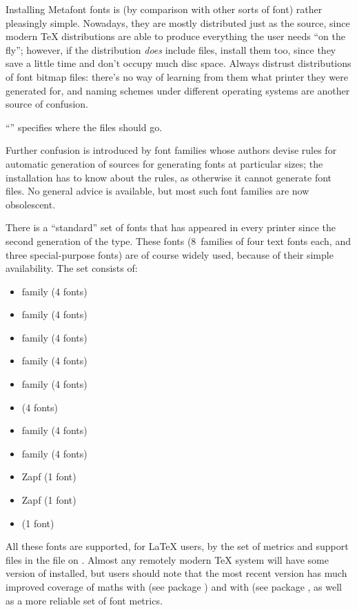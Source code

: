 
Installing Metafont fonts is (by comparison with other sorts of font) rather
pleasingly simple.  Nowadays, they are mostly distributed just as the
\MF{} source, since modern \TeX{} distributions are able to produce
everything the user needs ``on the fly''; however, if the distribution
\emph{does} include  files, install them too, since they
save a little time and don't occupy much disc space.  Always distrust
distributions of  font bitmap files: there's no way of
learning from them what printer they were generated for, and naming
schemes under different operating systems are another source of
confusion.

``''
specifies where the files should go.

Further confusion is introduced by font families whose authors devise rules
for automatic generation of \MF{} sources for generating fonts at
particular sizes; the installation has to know about the rules, as
otherwise it cannot generate font files.  No general advice is
available, but most such font families are now obsolescent.


There is a ``standard'' set of fonts that has appeared in every \PS{}
printer since the second generation of the type.  These fonts
(8~families of four text fonts each, and three special-purpose fonts)
are of course widely used, because of their simple availability.  The
set consists of:
\begin{itemize}
\item {} family (4 fonts)
\item {} family (4 fonts)
\item {}   family (4 fonts)
\item {} family (4 fonts)
\item {} family (4 fonts)
\item {}  (4 fonts)
\item {} family (4 fonts)
\item {} family (4 fonts)
\item Zapf  (1 font)
\item Zapf  (1 font)
\item {} (1 font)
\end{itemize}
All these fonts are supported, for \LaTeX{} users, by the
 set of metrics and support files in the file
 on .  Almost any remotely modern \TeX{}
system will have some version of  installed, but
users should note that the most recent version has much improved
coverage of maths with  (see package
) and with  (see package
, as well as a more reliable set of font metrics.

